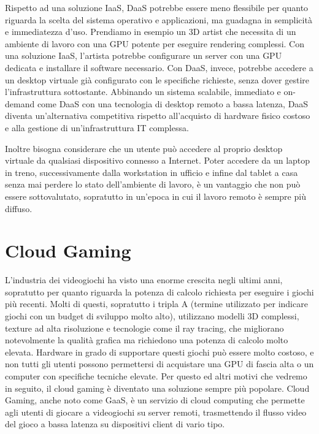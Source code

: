 \documentclass[12pt,a4paper,openright,twoside]{book}
\begin{document}
Rispetto ad una soluzione \ac{IaaS}, DaaS potrebbe essere meno flessibile per quanto riguarda la scelta del sistema operativo e applicazioni, ma guadagna in semplicità e immediatezza d'uso.
Prendiamo in esempio un 3D artist che necessita di un ambiente di lavoro con una GPU potente per eseguire rendering complessi. Con una soluzione \ac{IaaS}, l'artista potrebbe configurare un server con una GPU dedicata e installare il software necessario. Con DaaS, invece, potrebbe accedere a un desktop virtuale già configurato con le specifiche richieste, senza dover gestire l'infrastruttura sottostante.
Abbinando un sistema scalabile, immediato e on-demand come DaaS con una tecnologia di desktop remoto a bassa latenza, DaaS diventa un'alternativa competitiva rispetto all'acquisto di hardware fisico costoso e alla gestione di un'infrastruttura IT complessa.

Inoltre bisogna considerare che un utente può accedere al proprio desktop virtuale da qualsiasi dispositivo connesso a Internet.
Poter accedere da un laptop in treno, successivamente dalla workstation in ufficio e infine dal tablet a casa senza mai perdere lo stato dell'ambiente di lavoro, è un vantaggio che non può essere sottovalutato, sopratutto in un'epoca in cui il lavoro remoto è sempre più diffuso.

\section{Cloud Gaming}
\label{sec:cloud-gaming}
L'industria dei videogiochi ha visto una enorme crescita negli ultimi anni, sopratutto per quanto riguarda la potenza di calcolo richiesta per eseguire i giochi più recenti. Molti di questi, sopratutto i tripla A (termine utilizzato per indicare giochi con un budget di sviluppo molto alto), utilizzano modelli 3D complessi, texture ad alta risoluzione e tecnologie come il ray tracing, che migliorano notevolmente la qualità grafica ma richiedono una potenza di calcolo molto elevata.
Hardware in grado di supportare questi giochi può essere molto costoso, e non tutti gli utenti possono permettersi di acquistare una GPU di fascia alta o un computer con specifiche tecniche elevate.
Per questo ed altri motivi che vedremo in seguito, il cloud gaming è diventato una soluzione sempre più popolare.
Cloud Gaming, anche noto come \ac{GaaS}, è un servizio di cloud computing che permette agli utenti di giocare a videogiochi su server remoti, trasmettendo il flusso video del gioco a bassa latenza su dispositivi client di vario tipo. \cite{HARLE2023}
\end{document}
